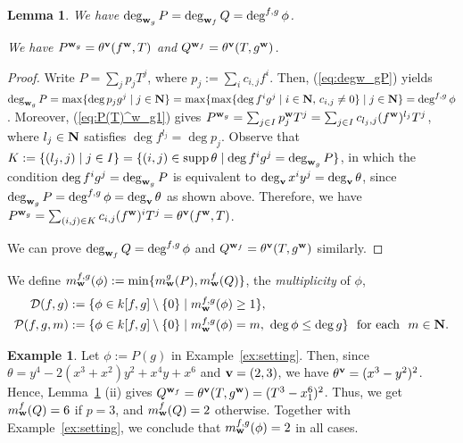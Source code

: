 \documentclass{amsart}
\theoremstyle{plain}
\newtheorem{lem}[thm]{Lemma}
\theoremstyle{definition}
\newtheorem{example}[thm]{Example}
\newcommand{\zs}{\{ 0\} }
\newcommand{\sm}{\setminus}
\newcommand{\nd}{\noindent}
\newcommand{\N}{{\bf N}}
\newcommand{\w}{{\bf w}}
\newcommand{\bv}{{\bf v}}
\newcommand{\degw  }{\deg}
\newcommand{\supp }{\mathop{\rm supp}\nolimits}
\begin{document}
\begin{lem}\label{lem:PQ}
\nd{\rm (i)} We have $\deg _{\w _g}P=\deg _{\w _f}Q=\degw ^{f,g}\phi $. 


\nd{\rm (ii)} 
We have $P^{\w _g}=\theta ^{\bv }(f^{\w },T)$ and 
$Q^{\w _f}=\theta ^{\bv }(T,g^{\w })$.  
\end{lem}


\begin{proof}
Write $P=\sum _jp_jT^j$, 
where $p_j:=\sum _ic_{i,j}f^i$. 
Then, 
(\ref{eq:degw_gP}) yields 
$\deg _{\w _g}P
=\max \{ \deg p_jg^j\mid j\in \N \} 
=\max \{ \max \{ \deg f^ig^j\mid i\in \N ,\,
c_{i,j}\ne 0\} \mid j\in \N \} 
=\degw ^{f,g}\phi $. 
Moreover, 
(\ref{eq:P(T)^w_g1}) gives 
$P^{\w _g}=\sum _{j\in I}p_j^{\w }T^j
=\sum _{j\in I}c_{l_j,j}(f^{\w })^{l_j}T^j$, 
where $l_j\in \N $ satisfies 
$\deg f^{l_j}=\deg p_j$. 
Observe that 
$K:=\{ (l_j,j)\mid j\in I\} 
=\{ (i,j)\in \supp \theta \mid \deg f^ig^j=\deg _{\w _g}P\} $, 
in which the condition 
$\deg f^ig^j=\deg _{\w _g}P$ is equivalent to 
$\deg _{\bv }x^iy^j=\deg _{\bv }\theta $, 
since $\deg _{\w _g}P=\degw ^{f,g}\phi =\deg _{\bv }\theta $ 
as shown above. 
Therefore, we have 
$P^{\w _g}=\sum _{(i,j)\in K}c_{i,j}(f^{\w })^iT^j=\theta ^{\bv }(f^{\w },T)$. 



We can prove 
$\deg _{\w _f}Q=\degw ^{f,g}\phi $ and 
$Q^{\w _f}=\theta ^{\bv }(T,g^{\w })$ similarly. 
\end{proof}




We define 
$m_{\w }^{f,g}(\phi ):=\min \{ m_{\w }^g(P),m_{\w }^f(Q)\} $, 
the {\it multiplicity} of $\phi $, 
\begin{align*}
\mathcal{D}(f,g)&:=\{ 
\phi \in k[f,g]\sm \zs \mid 
m_{\w }^{f,g}(\phi )\ge 1\} , \\
\mathcal{P}(f,g,m)&:=\{ \phi \in k[f,g]\sm \zs \mid 
m_{\w }^{f,g} (\phi )=m,\ \deg \phi \le \deg g\}  
\text{ \ for each \ }m\in \N . 
\end{align*}




\begin{example}
Let $\phi :=P(g)$ in Example~\ref{ex:setting}. 
Then, 
since $\theta =y^4-2(x^3+x^2)y^2+x^4y+x^6$ and $\bv =(2,3)$, 
we have $\theta ^{\bv }=(x^3-y^2)^2$. 
Hence, Lemma~\ref{lem:PQ} (ii) gives 
$Q^{\w _f}=\theta ^{\bv }(T,g^{\w })=(T^3-x_1^6)^2$. 
Thus, we get $m_{\w }^f(Q)=6$ if $p=3$, 
and $m_{\w }^f(Q)=2$ otherwise. 
Together with Example~\ref{ex:setting}, 
we conclude that 
$m_{\w }^{f,g}(\phi )=2$ in all cases. 
\end{example}
\end{document}
